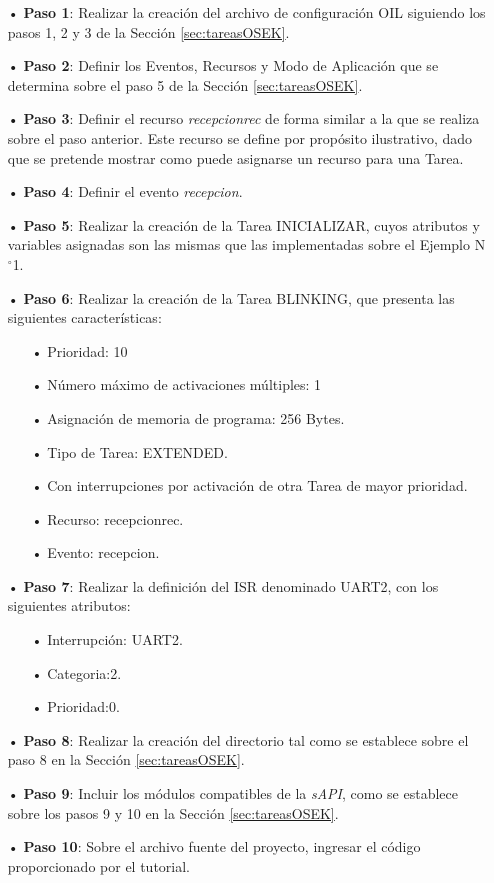 \documentclass[12pt,letterpaper]{article}
\begin{document}
\begin{enumerate}

\item[•]\textbf{Paso 1}: Realizar la creación del archivo de configuración OIL siguiendo los pasos 1, 2 y 3 de la Sección \ref{sec:tareasOSEK}.
\item[•]\textbf{Paso 2}: Definir los Eventos, Recursos y Modo de Aplicación que se determina sobre el paso 5 de la Sección \ref{sec:tareasOSEK}.
\item[•]\textbf{Paso 3}: Definir el recurso \textit{recepcionrec} de forma similar a la que se realiza sobre el paso anterior. Este recurso se define por propósito ilustrativo, dado que se pretende mostrar como puede asignarse un recurso para una Tarea.
\item[•]\textbf{Paso 4}: Definir el evento \textit{recepcion}.
\item[•]\textbf{Paso 5}: Realizar la creación de la Tarea INICIALIZAR, cuyos atributos y variables asignadas son las mismas que las implementadas sobre el Ejemplo N$^{\circ}$1.

\item[•]\textbf{Paso 6}: Realizar la creación de la Tarea BLINKING, que presenta las siguientes características:
\begin{enumerate}
\item[•]Prioridad: 10
\item[•]Número máximo de activaciones múltiples: 1
\item[•]Asignación de memoria de programa: 256 Bytes.
\item[•]Tipo de Tarea: EXTENDED.
\item[•]Con interrupciones por activación de otra Tarea de mayor prioridad.
\item[•]Recurso: recepcionrec.
\item[•]Evento: recepcion.
\end{enumerate}

\item[•]\textbf{Paso 7}: Realizar la definición del ISR denominado UART2, con los siguientes atributos:
\begin{enumerate}
\item[•]Interrupción: UART2.
\item[•]Categoria:2.
\item[•]Prioridad:0.
\end{enumerate}

\item[•]\textbf{Paso 8}: Realizar la creación del directorio tal como se establece sobre el paso 8 en la Sección \ref{sec:tareasOSEK}.
\item[•]\textbf{Paso 9}: Incluir los módulos compatibles de la \textit{sAPI}, como se establece sobre los pasos 9 y 10 en la Sección \ref{sec:tareasOSEK}.
\item[•]\textbf{Paso 10}: Sobre el archivo fuente del proyecto, ingresar el código proporcionado por el tutorial.

\end{enumerate}
\end{document}
